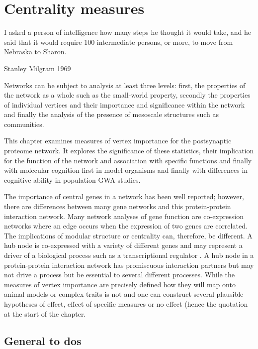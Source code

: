 \chapter{Centrality measures}




 \begin{displayquote}
 I asked a person of intelligence how many steps he thought it would take, and he said that it would require 100 intermediate persons, or more, to move from Nebraska to Sharon.
 
 Stanley Milgram 1969
\end{displayquote}




 Networks can be subject to analysis at least three levels: first, the properties of the network as a whole such as the small-world property, secondly the properties of individual vertices and their importance and significance within the network and finally the analysis of the presence of mesoscale structures such as communities.

This chapter examines measures of vertex importance for the postsynaptic proteome network. It explores the significance of these statistics, their implication for the function of the network and association with specific functions and finally with molecular cognition first in model organisms and finally with differences in cognitive ability in population GWA studies.   

 The importance of central genes in a network has been well reported; however, there are differences between many gene networks and this protein-protein interaction network. Many network analyses of gene function are co-expression networks where an edge occurs when the expression of two genes are correlated. The implications of modular structure or centrality can, therefore, be different. A hub node is co-expressed with a variety of different genes and may represent a driver of a biological process such as a transcriptional regulator . A hub node in a protein-protein interaction network has promiscuous interaction partners but may not drive a process but be essential to several different processes. 
While the measures of vertex importance are precisely defined how they will map onto animal models or complex traits is not and one can construct several plausible hypotheses of effect, effect of specific measures or no effect (hence the quotation at the start of the chapter.
\section{General to dos}

